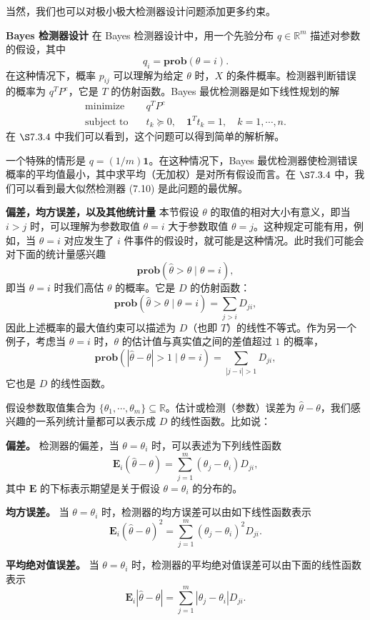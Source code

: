 \documentclass[UTF8, 12pt, fontset=fandol, oneside]{ctexart}
\begin{document}
当然，我们也可以对极小极大检测器设计问题添加更多约束。

\noindent\textbf{Bayes 检测器设计}\quad
在 Bayes 检测器设计中，用一个先验分布 $q\in\mathbb{R}^m$ 描述对参数的假设，其中
\[
q_i=\mathbf{prob}(\theta=i).
\]
在这种情况下，概率 $p_{ij}$ 可以理解为给定 $\theta$ 时，$X$ 的条件概率。检测器判断错误的概率为 $q^TP^e$，它是 $T$ 的仿射函数。Bayes 最优检测器是如下线性规划的解
\[
\begin{aligned}
\text{minimize}\quad & q^TP^e\\
\text{subject to}\quad & t_k\succeq 0,\quad \mathbf{1}^Tt_k=1,\quad k=1,\cdots,n.
\end{aligned}
\]
在 $\S 7.3.4$ 中我们可以看到，这个问题可以得到简单的解析解。

一个特殊的情形是 $q=(1/m)\mathbf{1}$。在这种情况下，Bayes 最优检测器使检测错误概率的平均值最小，其中求平均（无加权）是对所有假设而言。在 $\S 7.3.4$ 中，我们可以看到最大似然检测器 (7.10) 是此问题的最优解。

\noindent\textbf{偏差，均方误差，以及其他统计量}\quad
本节假设 $\theta$ 的取值的相对大小有意义，即当 $i>j$ 时，可以理解为参数取值 $\theta=i$ 大于参数取值 $\theta=j$。这种规定可能有用，例如，当 $\theta=i$ 对应发生了 $i$ 件事件的假设时，就可能是这种情况。此时我们可能会对下面的统计量感兴趣
\[
\mathbf{prob}(\hat{\theta}>\theta\mid \theta=i),
\]
即当 $\theta=i$ 时我们高估 $\theta$ 的概率。它是 $D$ 的仿射函数：
\[
\mathbf{prob}(\hat{\theta}>\theta\mid \theta=i)=\sum_{j>i}D_{ji},
\]
因此上述概率的最大值约束可以描述为 $D$（也即 $T$）的线性不等式。作为另一个例子，考虑当 $\theta=i$ 时，$\theta$ 的估计值与真实值之间的差值超过 $1$ 的概率，
\[
\mathbf{prob}(|\hat{\theta}-\theta|>1\mid \theta=i)=\sum_{|j-i|>1}D_{ji},
\]
它也是 $D$ 的线性函数。

假设参数取值集合为 $\{\theta_1,\cdots,\theta_m\}\subseteq\mathbb{R}$。估计或检测（参数）误差为 $\hat{\theta}-\theta$，我们感兴趣的一系列统计量都可以表示成 $D$ 的线性函数。比如说：

\noindent\textbf{偏差。}\quad
检测器的偏差，当 $\theta=\theta_i$ 时，可以表述为下列线性函数
\[
\mathbf{E}_i(\hat{\theta}-\theta)=\sum_{j=1}^m(\theta_j-\theta_i)D_{ji},
\]
其中 $\mathbf{E}$ 的下标表示期望是关于假设 $\theta=\theta_i$ 的分布的。

\noindent\textbf{均方误差。}\quad
当 $\theta=\theta_i$ 时，检测器的均方误差可以由如下线性函数表示
\[
\mathbf{E}_i(\hat{\theta}-\theta)^2=\sum_{j=1}^m(\theta_j-\theta_i)^2D_{ji}.
\]

\noindent\textbf{平均绝对值误差。}\quad
当 $\theta=\theta_i$ 时，检测器的平均绝对值误差可以由下面的线性函数表示
\[
\mathbf{E}_i|\hat{\theta}-\theta|=\sum_{j=1}^m|\theta_j-\theta_i|D_{ji}.
\]
\end{document}

